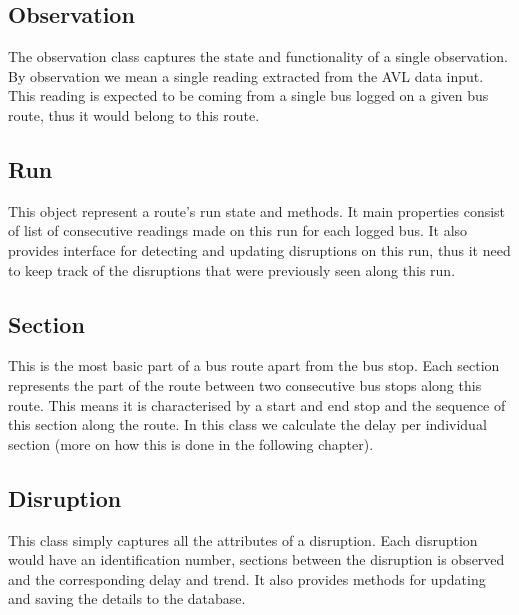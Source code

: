 \subsection{Observation}
The observation class captures the state and functionality of a single observation. By observation we mean a single reading extracted from the AVL data input. This reading is expected to be coming from a single bus logged on a given bus route, thus it would belong to this route. 

\subsection{Run}
This object represent a route's run state and methods. It main properties consist of list of consecutive readings made on this run for each logged bus. It also provides interface for detecting and updating disruptions on this run, thus it need to keep track of the disruptions that were previously seen along this run.

\subsection{Section}
This is the most basic part of a bus route apart from the bus stop. Each section represents the part of the route between two consecutive bus stops along this route. This means it is characterised by a start and end stop and the sequence of this section along the route. In this class we calculate the delay per individual section (more on how this is done in the following chapter).

\subsection{Disruption}
This class simply captures all the attributes of a disruption. Each disruption would have an identification number, sections between the disruption is observed and the corresponding delay and trend. It also provides methods for updating and saving the details to the database.